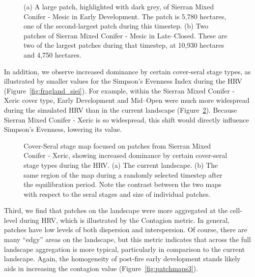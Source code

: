 \begin{figure}[!htbp]
  \centering
  \caption{(a) A large patch, highlighted with dark grey, of Sierran Mixed Conifer - Mesic in Early Development. The patch is 5,780 hectares, one of the second-largest patch during this timestep. (b) Two patches of Sierran Mixed Conifer - Mesic in Late--Closed. These are two of the largest patches during that timestep, at 10,930 hectares and 4,750 hectares.} 
  \label{fig:patchmaps1}
\end{figure}



In addition, we observe increased dominance by certain cover-seral stage types, as illustrated by smaller values for the Simpson's Evenness Index during the HRV (Figure~\ref{fig:fragland_siei}). For example, within the Sierran Mixed Conifer - Xeric cover type, Early Development and Mid--Open were much more widespread during the simulated HRV than in the current landscape (Figure~\ref{fig:patchmaps2}). Because Sierran Mixed Conifer - Xeric is so widespread, this shift would directly influence Simpson's Evenness, lowering its value.

\begin{figure}[!htbp]
  \centering
  \caption{Cover-Seral stage map focused on patches from Sierran Mixed Conifer - Xeric, showing increased dominance by certain cover-seral stage types during the HRV. (a) The current landscape. (b) The same region of the map during a randomly selected timestep after the equilibration period. Note the contrast between the two maps with respect to the seral stages and size of individual patches.} 
  \label{fig:patchmaps2}
\end{figure}


Third, we find that patches on the landscape were more aggregated at the cell-level during HRV, which is illustrated by the Contagion metric. In general, patches have low levels of both dispersion and interspersion. Of course, there are many ``edgy'' areas on the landscape, but this metric indicates that across the full landscape aggregation is more typical, particularly in comparison to the current landscape. Again, the homogeneity of post-fire early development stands likely aids in increasing the contagion value (Figure~\ref{fig:patchmaps3}). 

